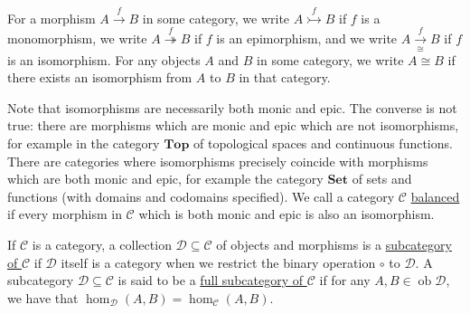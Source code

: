 \documentclass[a4paper,11pt]{article}
\theoremstyle{break_italics}
\theoremstyle{break_upright}
\theoremstyle{remark}
\newcommand{\ob}{\operatorname{ob}}
\newcommand{\C}{\mathcal{C}}
\newcommand{\D}{\mathcal{D}}
\newcommand{\Set}{\mathbf{Set}}
\begin{document}
For a morphism $A \xrightarrow{f} B$ in some category, we write $A \overset{f}\rightarrowtail B$ if $f$ is a monomorphism, we write $A \overset{f} \twoheadrightarrow B$ if $f$ is an epimorphism, and we write $A \xrightarrow[\cong]{f} B$ if $f$ is an isomorphism. For any objects $A$ and $B$ in some category, we write $A \cong B$ if there exists an isomorphism from $A$ to $B$ in that category.

Note that isomorphisms are necessarily both monic and epic. The converse is not true: there are morphisms which are monic and epic which are not isomorphisms, for example in the category $\mathbf{Top}$ of topological spaces and continuous functions. There are categories where isomorphisms precisely coincide with morphisms which are both monic and epic, for example the category $\Set$ of sets and functions (with domains and codomains specified). We call a category $\C$ \uline{balanced} if every morphism in $\C$ which is both monic and epic is also an isomorphism.

If $\C$ is a category, a collection $\D \subseteq \C$ of objects and morphisms is a \uline{subcategory of $\C$} if $\D$ itself is a category when we restrict the binary operation $\circ$ to $\D$. A subcategory $\D \subseteq \C$ is said to be a \uline{full subcategory of $\C$} if for any $A,B \in \ob\D$, we have that $\hom_\D(A,B) = \hom_\C(A,B)$.
\end{document}
